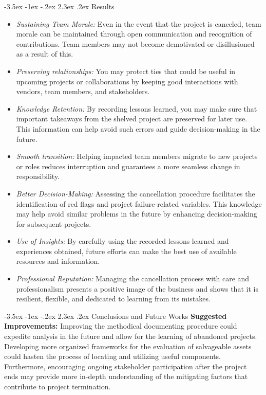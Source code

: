 \documentclass[11pt]{article}
\makeatletter
\renewcommand\section{\@startsection {section}{1}{\z@}%
                                       {-3.5ex \@plus -1ex \@minus -.2ex}%
                                       {2.3ex \@plus.2ex}%
                                       {\normalfont\fontfamily{phv}\fontsize{14}{17}\bfseries}}
\makeatother
\begin{document}
{    \section{Results}
    \begin{itemize}
        \item \textit{Sustaining Team Morale:} Even in the event that the project is canceled, team morale can be maintained through open communication and recognition of contributions. Team members may not become demotivated or disillusioned as a result of this.
        \item \textit{Preserving relationships:} You may protect ties that could be useful in upcoming projects or collaborations by keeping good interactions with vendors, team members, and stakeholders.
        \item \textit{Knowledge Retention:} By recording lessons learned, you may make sure that important takeaways from the shelved project are preserved for later use. This information can help avoid such errors and guide decision-making in the future.
        \item \textit{Smooth transition:} Helping impacted team members migrate to new projects or roles reduces interruption and guarantees a more seamless change in responsibility.
        \item \textit{Better Decision-Making:} Assessing the cancellation procedure facilitates the identification of red flags and project failure-related variables. This knowledge may help avoid similar problems in the future by enhancing decision-making for subsequent projects.
        \item \textit{Use of Insights:} By carefully using the recorded lessons learned and experiences obtained, future efforts can make the best use of available resources and information.
        \item \textit{Professional Reputation:} Managing the cancellation process with care and professionalism presents a positive image of the business and shows that it is resilient, flexible, and dedicated to learning from its mistakes.

    \end{itemize}
    
    \section{Conclusions and Future Works}
    \hspace{1cm} \textbf{Suggested Improvements:} Improving the methodical documenting procedure could expedite analysis in the future and allow for the learning of abandoned projects. Developing more organized frameworks for the evaluation of salvageable assets could hasten the process of locating and utilizing useful components. Furthermore, encouraging ongoing stakeholder participation after the project ends may provide more in-depth understanding of the mitigating factors that contribute to project termination. 
    
}
\end{document}

